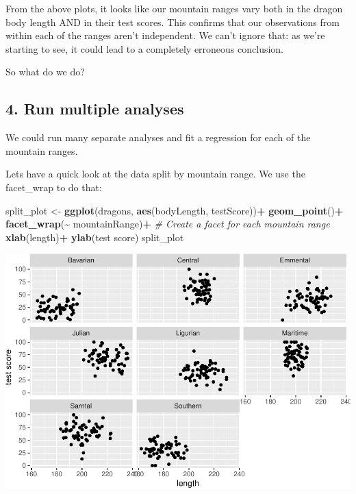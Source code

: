 \documentclass[
]{article}
\newenvironment{Shaded}{\begin{snugshade}}{\end{snugshade}}
\newcommand{\CommentTok}[1]{\textcolor[rgb]{0.56,0.35,0.01}{\textit{#1}}}
\newcommand{\FunctionTok}[1]{\textcolor[rgb]{0.13,0.29,0.53}{\textbf{#1}}}
\newcommand{\NormalTok}[1]{#1}
\newcommand{\OtherTok}[1]{\textcolor[rgb]{0.56,0.35,0.01}{#1}}
\newcommand{\SpecialCharTok}[1]{\textcolor[rgb]{0.81,0.36,0.00}{\textbf{#1}}}
\newcommand{\StringTok}[1]{\textcolor[rgb]{0.31,0.60,0.02}{#1}}
\begin{document}
From the above plots, it looks like our mountain ranges vary both in the
dragon body length AND in their test scores. This confirms that our
observations from within each of the ranges aren't independent. We can't
ignore that: as we're starting to see, it could lead to a completely
erroneous conclusion.

So what do we do?

\subsection{4. Run multiple analyses}\label{run-multiple-analyses}

We could run many separate analyses and fit a regression for each of the
mountain ranges.

Lets have a quick look at the data split by mountain range. We use the
facet\_wrap to do that:

\begin{Shaded}
\begin{Highlighting}[]
\NormalTok{split\_plot }\OtherTok{\textless{}{-}} \FunctionTok{ggplot}\NormalTok{(dragons, }\FunctionTok{aes}\NormalTok{(bodyLength, testScore))}\SpecialCharTok{+}
  \FunctionTok{geom\_point}\NormalTok{()}\SpecialCharTok{+}
  \FunctionTok{facet\_wrap}\NormalTok{(}\SpecialCharTok{\textasciitilde{}}\NormalTok{ mountainRange)}\SpecialCharTok{+}   \CommentTok{\# Create a facet for each mountain range}
  \FunctionTok{xlab}\NormalTok{(}\StringTok{\textquotesingle{}length\textquotesingle{}}\NormalTok{)}\SpecialCharTok{+}
  \FunctionTok{ylab}\NormalTok{(}\StringTok{\textquotesingle{}test score\textquotesingle{}}\NormalTok{)}
\NormalTok{split\_plot}
\end{Highlighting}
\end{Shaded}

\includegraphics{Introduction-to-linear-mixed-models_files/figure-latex/unnamed-chunk-10-1.pdf}
\end{document}
